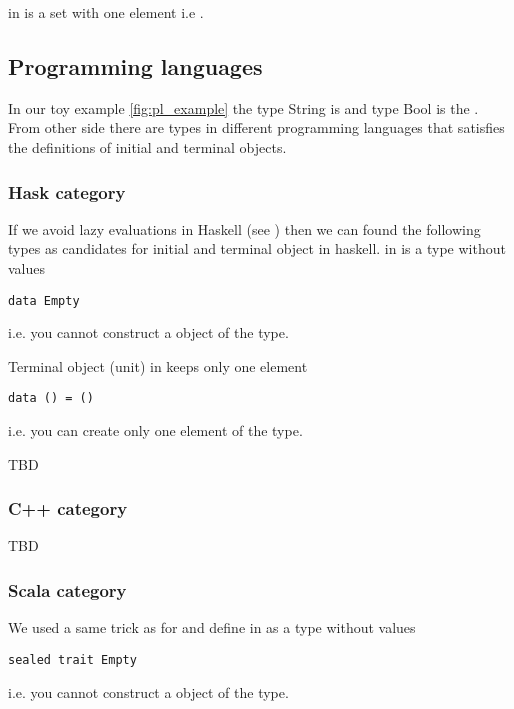 \begin{example}
\label{ex:set_terminal_object}
 in  is a set
with one element i.e . 
\end{example}


\subsection{Programming languages}
In our toy example \cref{fig:pl_example} the type String is
 and type Bool is the
. From other side there are types in
different programming languages that satisfies the definitions of
initial and terminal objects.

\subsubsection{\textbf{Hask} category}
\begin{example}
If we avoid lazy evaluations in Haskell (see
) then we can found the following types
as candidates for initial and terminal object in haskell. 
\label{ex:hask_initial_object}
 in  is a
type without values 
\begin{verbatim}
data Empty
\end{verbatim}
i.e. you cannot construct a object of the type.
\end{example}

\begin{example}
\label{ex:hask_terminal_object}
Terminal object (unit) in  keeps only one element
\begin{verbatim}
data () = ()
\end{verbatim}
i.e. you can create only one element of the type.
\end{example}

TBD
\subsubsection{\textbf{C++} category}
TBD
\subsubsection{\textbf{Scala} category}
\begin{example}
\label{ex:scala_initial_object}
We used a same trick as for  and define
 in  as a
type without values 
\begin{verbatim}
sealed trait Empty
\end{verbatim}
i.e. you cannot construct a object of the type.
\end{example}

